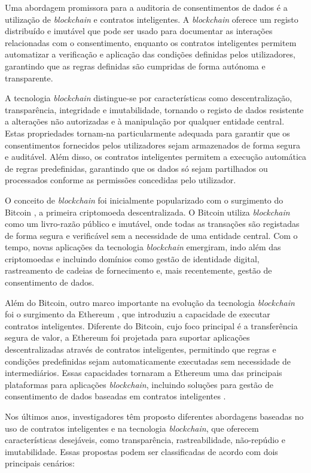 Uma abordagem promissora para a auditoria de consentimentos de dados é a utilização de \textit{blockchain} e contratos inteligentes. A \textit{blockchain} oferece um registo distribuído e imutável que pode ser usado para documentar as interações relacionadas com o consentimento, enquanto os contratos inteligentes permitem automatizar a verificação e aplicação das condições definidas pelos utilizadores, garantindo que as regras definidas são cumpridas de forma autónoma e transparente.

A tecnologia \textit{blockchain} distingue-se por características como descentralização, transparência, integridade e imutabilidade, tornando o registo de dados resistente a alterações não autorizadas e à manipulação por qualquer entidade central. Estas propriedades tornam-na particularmente adequada para garantir que os consentimentos fornecidos pelos utilizadores sejam armazenados de forma segura e auditável. Além disso, os contratos inteligentes permitem a execução automática de regras predefinidas, garantindo que os dados só sejam partilhados ou processados conforme as permissões concedidas pelo utilizador.

O conceito de \textit{blockchain} foi inicialmente popularizado com o surgimento do Bitcoin \citep{nakamoto2008bitcoin}, a primeira criptomoeda descentralizada. O Bitcoin utiliza \textit{blockchain} como um livro-razão público e imutável, onde todas as transações são registadas de forma segura e verificável sem a necessidade de uma entidade central. Com o tempo, novas aplicações da tecnologia \textit{blockchain} emergiram, indo além das criptomoedas e incluindo domínios como gestão de identidade digital, rastreamento de cadeias de fornecimento e, mais recentemente, gestão de consentimento de dados.

Além do Bitcoin, outro marco importante na evolução da tecnologia \textit{blockchain} foi o surgimento da Ethereum \citep{buterin2014next}, que introduziu a capacidade de executar contratos inteligentes. Diferente do Bitcoin, cujo foco principal é a transferência segura de valor, a Ethereum foi projetada para suportar aplicações descentralizadas através de contratos inteligentes, permitindo que regras e condições predefinidas sejam automaticamente executadas sem necessidade de intermediários. Essas capacidades tornaram a Ethereum uma das principais plataformas para aplicações \textit{blockchain}, incluindo soluções para gestão de consentimento de dados baseadas em contratos inteligentes \citep{Frank2018}.

Nos últimos anos, investigadores têm proposto diferentes abordagens baseadas no uso de contratos inteligentes e na tecnologia \textit{blockchain}, que oferecem características desejáveis, como transparência, rastreabilidade, não-repúdio e imutabilidade. Essas propostas podem ser classificadas de acordo com dois principais cenários:

